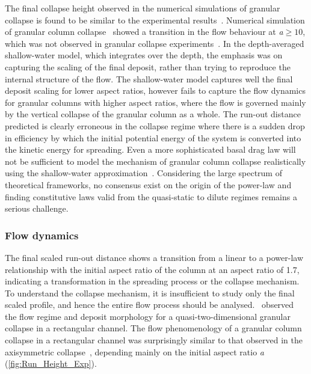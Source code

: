The final collapse height observed in the numerical simulations of granular 
collapse is found to be similar to the experimental 
results~\citep{Lube2005,Balmforth2005}. Numerical simulation of granular 
column collapse~\citep{Lacaze2008,Staron2007a} showed a transition in the flow 
behaviour at \textit{a}$\ge 10$, which was not observed in granular collapse 
experiments~\citep{Balmforth2005,Lube2005,Lajeunesse2004}. In the 
depth-averaged shallow-water model, which integrates over the depth, the 
emphasis was on capturing the scaling of the final deposit, rather than trying 
to reproduce the internal structure of the flow. The shallow-water model 
captures well the final deposit scaling for lower aspect ratios, however fails 
to capture the flow dynamics for granular columns with higher aspect ratios, 
where the flow is governed mainly by the vertical collapse of the granular 
column as a whole. The run-out distance predicted is clearly erroneous in the 
collapse regime where there is a sudden drop in efficiency by which the initial 
potential energy of the system is converted into the kinetic energy for 
spreading. Even a more sophisticated basal drag law will not be sufficient to 
model the mechanism of granular column collapse realistically using the 
shallow-water approximation~\citep{Kerswell2005}. Considering the large 
spectrum of theoretical frameworks, no consensus exist on the origin of the 
power-law and finding constitutive laws valid from the quasi-static to dilute 
regimes remains a serious challenge. 


\subsubsection{Flow dynamics}


The final scaled run-out distance shows a transition from a linear to a 
power-law relationship with the initial aspect ratio of the column at an aspect 
ratio of 1.7, indicating a transformation in the spreading process or the 
collapse mechanism. To 
understand the collapse mechanism, it is insufficient to study only the final 
scaled profile, and hence the entire flow process should be 
analysed.~\citet{Lajeunesse2005} observed the flow regime and deposit 
morphology for a quasi-two-dimensional granular collapse in a rectangular 
channel. The flow phenomenology of a granular column collapse in a rectangular 
channel was surprisingly similar to that observed in the axisymmetric 
collapse~\citep{Lube2005,Lajeunesse2004}, depending mainly on the initial 
aspect ratio \textit{a} (\cref{fig:Run_Height_Exp}). 

